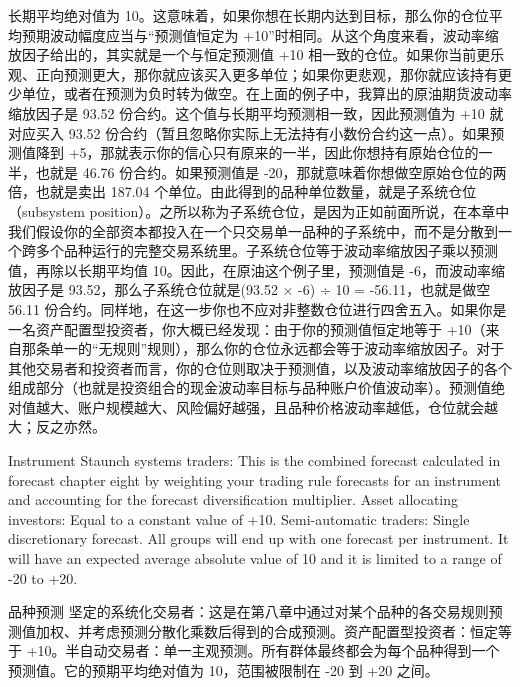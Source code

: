 \begin{chineseblock}长期平均绝对值为 10。这意味着，如果你想在长期内达到目标，那么你的仓位平均预期波动幅度应当与“预测值恒定为 +10”时相同。从这个角度来看，波动率缩放因子给出的，其实就是一个与恒定预测值 +10 相一致的仓位。如果你当前更乐观、正向预测更大，那你就应该买入更多单位；如果你更悲观，那你就应该持有更少单位，或者在预测为负时转为做空。在上面的例子中，我算出的原油期货波动率缩放因子是 93.52 份合约。这个值与长期平均预测相一致，因此预测值为 +10 就对应买入 93.52 份合约（暂且忽略你实际上无法持有小数份合约这一点）。如果预测值降到 +5，那就表示你的信心只有原来的一半，因此你想持有原始仓位的一半，也就是 46.76 份合约。如果预测值是 -20，那就意味着你想做空原始仓位的两倍，也就是卖出 187.04 个单位。由此得到的品种单位数量，就是子系统仓位（subsystem position）。之所以称为子系统仓位，是因为正如前面所说，在本章中我们假设你的全部资本都投入在一个只交易单一品种的子系统中，而不是分散到一个跨多个品种运行的完整交易系统里。子系统仓位等于波动率缩放因子乘以预测值，再除以长期平均值 10。因此，在原油这个例子里，预测值是 -6，而波动率缩放因子是 93.52，那么子系统仓位就是(93.52 × -6) ÷ 10 = -56.11，也就是做空 56.11 份合约。同样地，在这一步你也不应对非整数仓位进行四舍五入。如果你是一名资产配置型投资者，你大概已经发现：由于你的预测值恒定地等于 +10（来自那条单一的“无规则”规则），那么你的仓位永远都会等于波动率缩放因子。对于其他交易者和投资者而言，你的仓位则取决于预测值，以及波动率缩放因子的各个组成部分（也就是投资组合的现金波动率目标与品种账户价值波动率）。预测值绝对值越大、账户规模越大、风险偏好越强，且品种价格波动率越低，仓位就会越大；反之亦然。\end{chineseblock}


\begin{englishblock} Instrument Staunch systems traders: This is the combined forecast calculated in forecast chapter eight by weighting your trading rule forecasts for an instrument and accounting for the forecast diversification multiplier. Asset allocating investors: Equal to a constant value of +10. Semi-automatic traders: Single discretionary forecast. All groups will end up with one forecast per instrument. It will have an expected average absolute value of 10 and it is limited to a range of -20 to +20. \end{englishblock}

\begin{chineseblock}品种预测 坚定的系统化交易者：这是在第八章中通过对某个品种的各交易规则预测值加权、并考虑预测分散化乘数后得到的合成预测。资产配置型投资者：恒定等于 +10。半自动交易者：单一主观预测。所有群体最终都会为每个品种得到一个预测值。它的预期平均绝对值为 10，范围被限制在 -20 到 +20 之间。\end{chineseblock}

